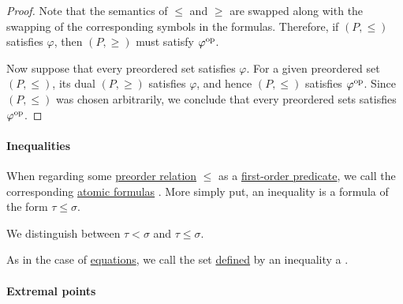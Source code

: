 \begin{proof}
  Note that the semantics of \( \leq \) and \( \geq \) are swapped along with the swapping of the corresponding symbols in the formulas. Therefore, if \( (P, \leq) \) satisfies \( \varphi \), then \( (P, \geq) \) must satisfy \( \varphi^{\operatorname{op}} \).

  Now suppose that every preordered set satisfies \( \varphi \). For a given preordered set \( (P, \leq) \), its dual \( (P, \geq) \) satisfies \( \varphi \), and hence \( (P, \leq) \) satisfies \( \varphi^{\operatorname{op}} \). Since \( (P, \leq) \) was chosen arbitrarily, we conclude that every preordered sets satisfies \( \varphi^{\operatorname{op}} \).
\end{proof}

\paragraph{Inequalities}

\begin{definition}\label{def:inequality}\mimprovised
  When regarding some \hyperref[def:preordered_set]{preorder relation} \( \leq \) as a \hyperref[def:first_order_language/pred]{first-order predicate}, we call the corresponding \hyperref[def:first_order_syntax/atomic_formula]{atomic formulas} . More simply put, an inequality is a formula of the form \( \tau \leq \sigma \).

  We distinguish between  \( \tau < \sigma \) and  \( \tau \leq \sigma \).

  As in the case of \hyperref[def:first_order_equation]{equations}, we call the set \hyperref[def:first_order_definability]{defined} by an inequality a .
\end{definition}

\paragraph{Extremal points}

